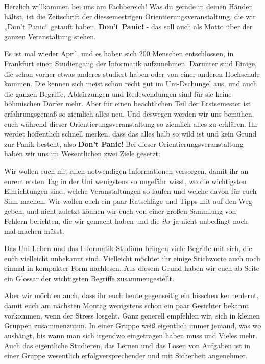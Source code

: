 \spaltenanfang
Herzlich willkommen bei uns am Fachbereich! Was du gerade in deinen Händen
hältst, ist die Zeitschrift der diessemestrigen Orientierungsveranstaltung, die
wir „Don’t Panic“ getauft haben. \textbf{Don’t Panic!} - das soll auch als
Motto über der ganzen Veranstaltung stehen.


Es ist mal wieder April, und es haben sich 200 Menschen entschlossen,
in Frankfurt einen Studiengang der Informatik aufzunehmen. Darunter sind
Einige, die schon vorher etwas anderes studiert haben oder von einer anderen
Hochschule kommen. Die kennen sich meist schon recht gut im Uni-Dschungel aus,
und auch die ganzen Begriffe, Abkürzungen und Redewendungen sind für sie keine
böhmischen Dörfer mehr. Aber für einen beachtlichen Teil der Erstsemester ist
erfahrungsgemäß so ziemlich alles neu. Und deswegen werden wir uns bemühen,
euch während dieser Orientierungsveranstaltung so ziemlich alles zu erklären.
Ihr werdet hoffentlich schnell merken, dass das alles halb so wild ist und kein
Grund zur Panik besteht, also \textbf{Don’t Panic}! Bei dieser
Orientierungsveranstaltung haben wir uns im Wesentlichen zwei Ziele gesetzt:


Wir wollen euch mit allen notwendigen Informationen versorgen, damit ihr an
eurem ersten Tag in der Uni wenigstens so ungefähr wisst, wo die wichtigsten
Einrichtungen sind, welche Veranstaltungen so laufen und welche davon für euch
Sinn machen. Wir wollen euch ein paar Ratschläge und Tipps mit auf den Weg
geben, und nicht zuletzt können wir euch von einer großen Sammlung von Fehlern
berichten, die wir gemacht haben und die \textsl{ihr} ja nicht unbedingt noch
mal machen müsst.


Das Uni-Leben und das Informatik-Studium bringen viele Begriffe mit sich, die
euch vielleicht unbekannt sind. Vielleicht möchtet ihr einige Stichworte auch
noch einmal in kompakter Form nachlesen. Aus diesem Grund haben wir euch ab
Seite \pageref{glossar} ein Glossar der wichtigsten Begriffe zusammengestellt.


Aber wir möchten auch, dass ihr euch heute gegenseitig ein
bisschen kennenlernt, damit euch am nächsten Montag wenigstens schon ein paar
Gesichter bekannt vorkommen, wenn der Stress losgeht. Ganz generell empfehlen
wir, sich in kleinen Gruppen zusammenzutun. In einer Gruppe weiß eigentlich
immer jemand, was wo aushängt, bis wann man sich irgendwo eingetragen haben
muss und Vieles mehr. Auch das eigentliche Studieren, das Lernen und das Lösen
von Aufgaben ist in einer Gruppe wesentlich erfolgversprechender und mit
Sicherheit angenehmer.\\
\spaltenende
